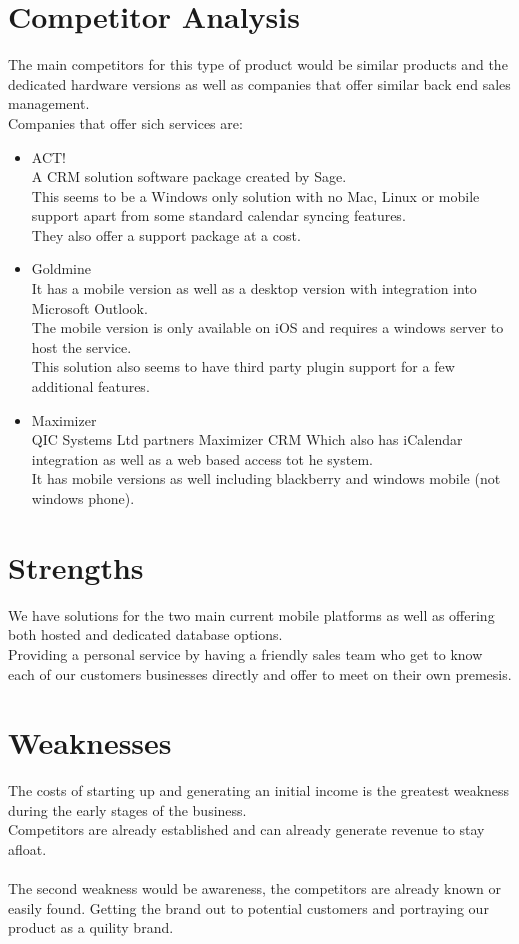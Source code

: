 \documentclass{article}
\begin{document}
\section{Competitor Analysis}
The main competitors for this type of product would be similar products and the dedicated hardware versions as well as companies that offer similar back end sales management.
\\Companies that offer sich services are:
\begin{itemize}
\item ACT!
\\A CRM solution software package created by Sage.
\\This seems to be a Windows only solution with no Mac, Linux or mobile support apart from some standard calendar syncing features.
\\They also offer a support package at a cost.

\item Goldmine
\\It has a mobile version as well as a desktop version with integration into Microsoft Outlook.
\\The mobile version is only available on iOS and requires a windows server to host the service.
\\This solution also seems to have third party plugin support for a few additional features.

\item Maximizer
\\QIC Systems Ltd partners Maximizer CRM Which also has iCalendar integration as well as a web based access tot he system.
\\It has mobile versions as well including blackberry and windows mobile (not windows phone).

\end{itemize}



\section{Strengths}
We have solutions for the two main current mobile platforms as well as offering both hosted and dedicated database options.
\\Providing a personal service by having a friendly sales team who get to know each of our customers businesses directly and offer to meet on their own premesis.

\section{Weaknesses}
The costs of starting up and generating an initial income is the greatest weakness during the early stages of the business.
\\Competitors are already established and can already generate revenue to stay afloat.
\\\\The second weakness would be awareness, the competitors are already known or easily found.  Getting the brand out to potential customers and portraying our product as a quility brand.
\end{document}
